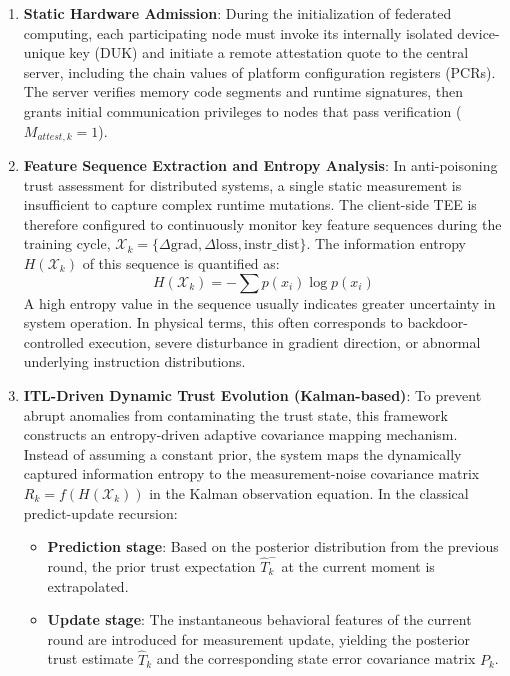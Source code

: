 \documentclass[runningheads,orivec]{llncs}
\begin{document}
\begin{enumerate}
    \item \textbf{Static Hardware Admission}: During the initialization of federated computing, each participating node must invoke its internally isolated device-unique key (DUK) and initiate a remote attestation quote to the central server, including the chain values of platform configuration registers (PCRs). The server verifies memory code segments and runtime signatures, then grants initial communication privileges to nodes that pass verification ($M_{attest,k}=1$).
    \item \textbf{Feature Sequence Extraction and Entropy Analysis}: In anti-poisoning trust assessment for distributed systems\cite{li2026multidimensional}, a single static measurement is insufficient to capture complex runtime mutations. The client-side TEE is therefore configured to continuously monitor key feature sequences during the training cycle, $\mathcal{X}_k = \{ \Delta \text{grad}, \Delta \text{loss}, \text{instr\_dist} \}$. The information entropy $H(\mathcal{X}_k)$ of this sequence is quantified as:
          \begin{equation}
              H(\mathcal{X}_k) = -\sum p(x_i) \log p(x_i)
          \end{equation}
          A high entropy value in the sequence usually indicates greater uncertainty in system operation. In physical terms, this often corresponds to backdoor-controlled execution, severe disturbance in gradient direction, or abnormal underlying instruction distributions.
    \item \textbf{ITL-Driven Dynamic Trust Evolution (Kalman-based)}: To prevent abrupt anomalies from contaminating the trust state, this framework constructs an entropy-driven adaptive covariance mapping mechanism. Instead of assuming a constant prior, the system maps the dynamically captured information entropy to the measurement-noise covariance matrix $R_k = f(H(\mathcal{X}_k))$ in the Kalman observation equation. In the classical predict-update recursion:
          \begin{itemize}
              \item \textbf{Prediction stage}: Based on the posterior distribution from the previous round, the prior trust expectation $\hat{T}_k^-$ at the current moment is extrapolated.
              \item \textbf{Update stage}: The instantaneous behavioral features of the current round are introduced for measurement update, yielding the posterior trust estimate $\hat{T}_k$ and the corresponding state error covariance matrix $P_k$.
          \end{itemize}
\end{enumerate}
\end{document}
